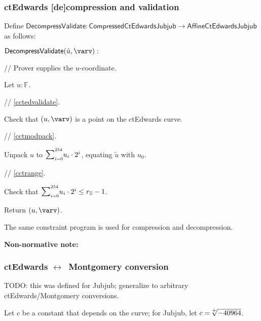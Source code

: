 \documentclass{article}
\newcommand{\lrarrow}{\texorpdfstring{$\leftrightarrow$}{↔}}
\newcommand{\crossref}[1]{\autoref{#1}}
\newcommand{\callout}[1]{\vspace{2ex plus 2pt minus 2pt}\noindent\textbf{#1}\hspace{1em}}
\newcommand{\nnote}[1]{\callout{Non-normative note:}{#1}}
\newcommand{\tab}{\hspace{1.5em}}
\newcommand{\typecolon}{:}
\newcommand{\Field}[1]{\mathbb{F}_{\!#1}}
\newcommand{\sop}[3]{\!\scalebox{0.89}{$\scalebox{1.404}{$\strut#3$}_{#1}^{#2}$}}
\newcommand{\ssum}[2]{\sop{#1}{#2}{\sum}}
\newcommand{\mult}{\cdot}
\newcommand{\possqrt}[1]{\raisebox{0.3ex}{${}^+$}\hspace{-0.7em}\sqrt{#1\vphantom{b}}}
\newcommand{\ParamS}[1]{{{#1}_\mathbb{\hskip 0.03em S}}}
\newcommand{\DecompressValidate}{\mathsf{DecompressValidate}}
\newcommand{\AffineCtEdwardsJubjub}{\mathsf{AffineCtEdwardsJubjub}}
\newcommand{\CompressedCtEdwardsJubjub}{\mathsf{CompressedCtEdwardsJubjub}}
\begin{document}
\subsubsection{ctEdwards [de]compression and validation} \label{ccteddecompressvalidate}

Define $\DecompressValidate \typecolon \CompressedCtEdwardsJubjub \rightarrow \AffineCtEdwardsJubjub$
as follows:

\begin{algorithm}
  \item $\DecompressValidate(\tilde{u}, \varv):$
  \item \tab // Prover supplies the $u$-coordinate.
  \item \tab Let $u \typecolon \Field{}$.
             \vspace{1ex}
  \item \tab // \crossref{cctedvalidate}.
  \item \tab Check that $(u, \varv)$ is a point on the ctEdwards curve.
             \vspace{1ex}
  \item \tab // \crossref{cctmodpack}.
  \item \tab Unpack $u$ to $\ssum{i=0}{254} u_i \mult 2^i$, equating $\tilde{u}$ with $u_0$.
             \vspace{1ex}
  \item \tab // \crossref{cctrange}.
  \item \tab Check that $\ssum{i=0}{254} u_i \mult 2^i \leq \ParamS{r}-1$.
             \vspace{1ex}
  \item \tab Return $(u, \varv)$.
\end{algorithm}

The same constraint program is used for compression and decompression.

\nnote{
The point-on-curve check could be omitted if $(u, \varv)$ were already known to be on the curve.
However, keeping it in this case provides a consistency check on the elliptic curve arithmetic.
}


\subsubsection{ctEdwards \lrarrow\ Montgomery conversion} \label{cctconversion}

TODO: this was defined for Jubjub; generalize to arbitrary ctEdwards/Montgomery conversions.

Let $c$ be a constant that depends on the curve; for Jubjub, let $c = \possqrt{-40964}$.
\end{document}
